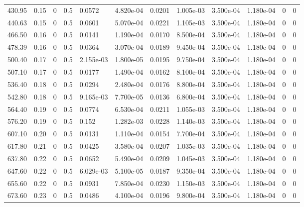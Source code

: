 \documentclass[preview]{standalone}
\begin{document}
{{\begin{tabular}{L{1.2cm}C{1.2cm} C{0.3cm}C{0.5cm} C{1.4cm}C{1.4cm} C{1.4cm}C{1.4cm} C{1.6cm}C{1.6cm} C{1.6cm}C{1.6cm}}
  430.95  &  0.15  & 0     & 0.5 &  0.0572  & 4.820e-04  &  0.0201&   1.005e-03& 3.500e-04 & 1.180e-04   &  0 & 0  \\ 
  440.63  &  0.15  & 0     & 0.5 &  0.0601  & 5.070e-04  &  0.0221&   1.105e-03& 3.500e-04 & 1.180e-04   &  0 & 0  \\ 
  466.50  &  0.16  & 0     & 0.5 &  0.0141  & 1.190e-04  &  0.0170&   8.500e-04& 3.500e-04 & 1.180e-04   &  0 & 0  \\ 
  478.39  &  0.16  & 0     & 0.5 &  0.0364  & 3.070e-04  &  0.0189&   9.450e-04& 3.500e-04 & 1.180e-04   &  0 & 0  \\ 
  500.40  &  0.17  & 0     & 0.5 &  2.155e-03  & 1.800e-05  &  0.0195&   9.750e-04& 3.500e-04 & 1.180e-04   &  0 & 0  \\ 
  507.10  &  0.17  & 0     & 0.5 &  0.0177  & 1.490e-04  &  0.0162&   8.100e-04& 3.500e-04 & 1.180e-04   &  0 & 0  \\ 
  536.40  &  0.18  & 0     & 0.5 &  0.0294  & 2.480e-04  &  0.0176&   8.800e-04& 3.500e-04 & 1.180e-04   &  0 & 0  \\ 
  542.80  &  0.18  & 0     & 0.5 &  9.165e-03  & 7.700e-05  &  0.0136&   6.800e-04& 3.500e-04 & 1.180e-04   &  0 & 0  \\ 
  564.40  &  0.19  & 0     & 0.5 &  0.0774  & 6.530e-04  &  0.0211&   1.055e-03& 3.500e-04 & 1.180e-04   &  0 & 0  \\ 
  576.20  &  0.19  & 0     & 0.5 &  0.152  & 1.282e-03  &  0.0228&   1.140e-03& 3.500e-04 & 1.180e-04   &  0 & 0  \\ 
  607.10  &  0.20  & 0     & 0.5 &  0.0131  & 1.110e-04  &  0.0154&   7.700e-04& 3.500e-04 & 1.180e-04   &  0 & 0  \\ 
  617.80  &  0.21  & 0     & 0.5 &  0.0425  & 3.580e-04  &  0.0207&   1.035e-03& 3.500e-04 & 1.180e-04   &  0 & 0  \\ 
  637.80  &  0.22  & 0     & 0.5 &  0.0652  & 5.490e-04  &  0.0209&   1.045e-03& 3.500e-04 & 1.180e-04   &  0 & 0  \\ 
  647.60  &  0.22  & 0     & 0.5 &  6.029e-03  & 5.100e-05  &  0.0187&   9.350e-04& 3.500e-04 & 1.180e-04   &  0 & 0  \\ 
  655.60  &  0.22  & 0     & 0.5 &  0.0931  & 7.850e-04  &  0.0230&   1.150e-03& 3.500e-04 & 1.180e-04   &  0 & 0  \\ 
  673.60  &  0.23  & 0     & 0.5 &  0.0486  & 4.100e-04  &  0.0196&   9.800e-04& 3.500e-04 & 1.180e-04   &  0 & 0  \\ 
\hline 
\end{tabular} 

}}
\end{document}
